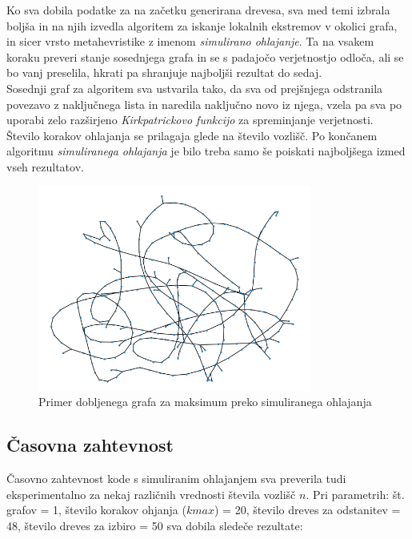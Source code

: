 \documentclass[a4paper, 12 pt]{article}
\begin{document}
 Ko sva dobila podatke za na začetku generirana drevesa, sva med temi izbrala boljša in na njih izvedla algoritem za iskanje lokalnih ekstremov v okolici grafa, in sicer vrsto metahevristike z imenom \textit{simulirano ohlajanje}. Ta na vsakem koraku preveri stanje sosednjega grafa in se s padajočo verjetnostjo odloča, ali se bo vanj preselila, hkrati pa shranjuje najboljši rezultat do sedaj. \\

Sosednji graf za algoritem sva ustvarila tako, da sva od prejšnjega odstranila povezavo z naključnega lista in naredila naključno novo iz njega, vzela pa sva po uporabi zelo razširjeno \textit{Kirkpatrickovo funkcijo} za spreminjanje verjetnosti. Število korakov ohlajanja se prilagaja glede na število vozlišč. Po končanem algoritmu \textit{simuliranega ohlajanja} je bilo treba samo še poiskati najboljšega izmed vseh rezultatov.
\pagebreak

\begin{figure}[H]
\centering
  \includegraphics[width=9cm]{drevo300max295.png}
  \caption{Primer dobljenega grafa za maksimum preko simuliranega ohlajanja}
  \label{fig:300max} 
\end{figure}

\subsection{Časovna zahtevnost}

Časovno zahtevnost kode s simuliranim ohlajanjem sva preverila tudi eksperimentalno za nekaj različnih vrednosti števila vozlišč $n$. Pri parametrih: št. grafov = 1, število korakov ohjanja ($kmax$) = 20, število dreves za odstanitev = 48, število dreves za izbiro = 50 sva dobila sledeče rezultate: \\
\end{document}
